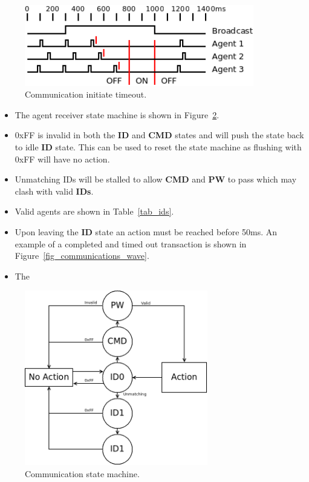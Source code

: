 \documentclass[a4paper]{article}
\begin{document}
      \begin{figure}[h]
         \centering
         \label{fig_communications_time}
         \includegraphics[width=10cm,keepaspectratio]{communications/communications_time.png} 
         \caption{Communication initiate timeout.}
      \end{figure}



\begin{itemize}
   \item    The agent receiver state machine is shown in Figure~\ref{fig_communications_sm}.
   \item    0xFF is invalid in both the \textbf{ID} and \textbf{CMD} states and will 
            push the state back to idle \textbf{ID} state. This can be used to reset the state machine
            as flushing with 0xFF will have no action.
   \item    Unmatching IDs will be stalled to allow \textbf{CMD} and \textbf{PW} to pass which may clash with valid \textbf{IDs}. 
   \item    Valid agents are shown in Table~\ref{tab_ids}.
   \item    Upon leaving the \textbf{ID} state an action must be reached before 50ms.
            An example of a completed and timed out transaction is shown in Figure~\ref{fig_communications_wave}.
   \item    The 
\end{itemize}

\begin{figure}[h]
   \centering
   \label{fig_communications_sm}
   \includegraphics[width=8cm,keepaspectratio]{communications/communications_sm.png} 
   \caption{Communication state machine.}
\end{figure}
\end{document}
